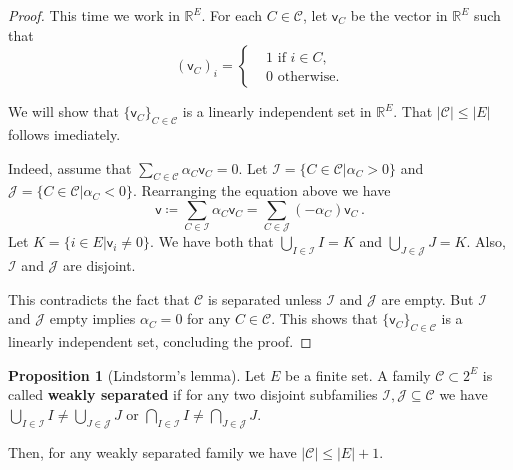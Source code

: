 \documentclass[12pt]{amsart}
\theoremstyle{definition}
\newtheorem{prop}[thm]{Proposition}
\newcommand{\R}{\mathbb{R}}
\newcommand{\CC}{\mathcal C}
\newcommand{\JJ}{\mathcal J}
\newcommand{\II}{\mathcal I}
\newcommand{\vv}{\mathsf{v}}
\begin{document}
\begin{proof}
This time we work in $\R^E$.
For each $C \in \CC$, let $\vv_C$ be the vector in $\R^E$ such that 
$$ (\vv_C)_i =\begin{cases*}
      & 1 \text{ if $i \in C$,}\\
      & 0 \text{ otherwise.}
    \end{cases*} $$


We will show that $ \{ \vv_C\}_{C\in \CC}$ is a linearly independent set in $\R^E$.
That $|\CC| \leq |E|$ follows imediately.

Indeed, assume that $\sum_{C \in \CC} \alpha_C \vv_C = 0$.
Let $\II = \{C \in \CC | \alpha_C > 0\}$ and $\JJ = \{C \in \CC | \alpha_C < 0\}$.
Rearranging the equation above we have
$$\vv \coloneqq \sum_{C \in \II} \alpha_C \vv_C  = \sum_{C \in \JJ} (- \alpha_C) \vv_C\, .$$
Let $K = \{i \in E| \vv_i \neq 0\}$.
We have both that $\bigcup_{I\in\II} I = K$ and $\bigcup_{J\in\JJ} J = K$.
Also, $\II$ and $\JJ$ are disjoint.

This contradicts the fact that $\CC$ is separated unless $\II$ and $\JJ$ are empty.
But $\II$ and $\JJ$ empty implies $\alpha_C = 0 $ for any $C \in \CC$.
This shows that $ \{ \vv_C\}_{C\in \CC}$ is a linearly independent set, concluding the proof.
\end{proof}




\begin{prop}[Lindstorm's lemma]
Let $E$ be a finite set.
A family $\CC \subset 2^E $ is called \textbf{weakly separated} if for any two disjoint subfamilies $\II, \JJ \subseteq \CC$ we have $\bigcup_{I\in\II} I \neq \bigcup_{J\in\JJ} J$ or $\bigcap_{I\in\II} I \neq \bigcap_{J\in\JJ} J$.

Then, for any weakly separated family we have $|\CC| \leq |E| + 1$.
\end{prop}
\end{document}
